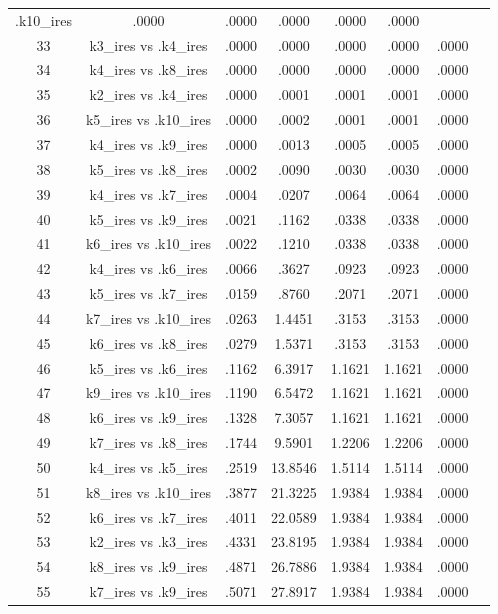 \documentclass[a4paper,10pt]{article}
\begin{document}
\begin{landscape}
\begin{table}[!htp]
\begin{tabular}{cccccccc}
.k10_ires&.0000&.0000&.0000&.0000&.0000\\33&k3_ires vs .k4_ires&.0000&.0000&.0000&.0000&.0000\\34&k4_ires vs .k8_ires&.0000&.0000&.0000&.0000&.0000\\35&k2_ires vs .k4_ires&.0000&.0001&.0001&.0001&.0000\\36&k5_ires vs .k10_ires&.0000&.0002&.0001&.0001&.0000\\37&k4_ires vs .k9_ires&.0000&.0013&.0005&.0005&.0000\\38&k5_ires vs .k8_ires&.0002&.0090&.0030&.0030&.0000\\39&k4_ires vs .k7_ires&.0004&.0207&.0064&.0064&.0000\\40&k5_ires vs .k9_ires&.0021&.1162&.0338&.0338&.0000\\41&k6_ires vs .k10_ires&.0022&.1210&.0338&.0338&.0000\\42&k4_ires vs .k6_ires&.0066&.3627&.0923&.0923&.0000\\43&k5_ires vs .k7_ires&.0159&.8760&.2071&.2071&.0000\\44&k7_ires vs .k10_ires&.0263&1.4451&.3153&.3153&.0000\\45&k6_ires vs .k8_ires&.0279&1.5371&.3153&.3153&.0000\\46&k5_ires vs .k6_ires&.1162&6.3917&1.1621&1.1621&.0000\\47&k9_ires vs .k10_ires&.1190&6.5472&1.1621&1.1621&.0000\\48&k6_ires vs .k9_ires&.1328&7.3057&1.1621&1.1621&.0000\\49&k7_ires vs .k8_ires&.1744&9.5901&1.2206&1.2206&.0000\\50&k4_ires vs .k5_ires&.2519&13.8546&1.5114&1.5114&.0000\\51&k8_ires vs .k10_ires&.3877&21.3225&1.9384&1.9384&.0000\\52&k6_ires vs .k7_ires&.4011&22.0589&1.9384&1.9384&.0000\\53&k2_ires vs .k3_ires&.4331&23.8195&1.9384&1.9384&.0000\\54&k8_ires vs .k9_ires&.4871&26.7886&1.9384&1.9384&.0000\\55&k7_ires vs .k9_ires&.5071&27.8917&1.9384&1.9384&.0000\\\hline
\end{tabular}
\end{table}

\end{landscape}
\end{document}
